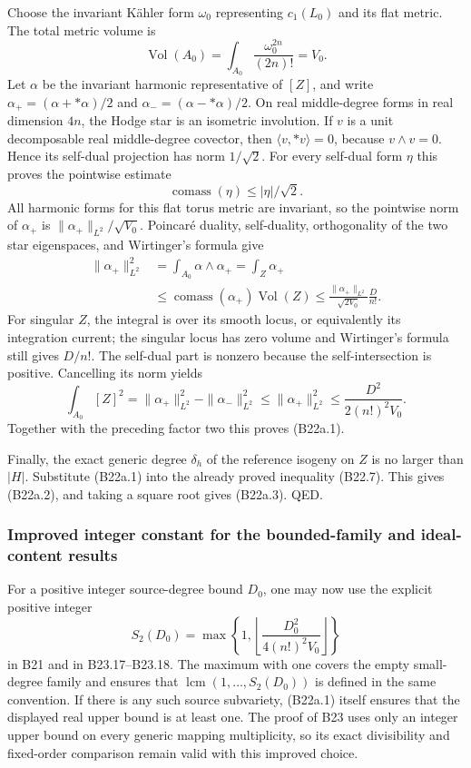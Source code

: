 \documentclass[11pt,a4paper]{article}
\theoremstyle{definition}
\begin{document}
Choose the invariant Kähler form \(\omega_0\) representing \(c_1(L_0)\) and its flat metric. The total metric volume is \[
 \operatorname{Vol}(A_0)=\int_{A_0}\frac{\omega_0^{2n}}{(2n)!}=V_0.
\] Let \(\alpha\) be the invariant harmonic representative of \([Z]\), and write \(\alpha_+=(\alpha+*\alpha)/2\) and \(\alpha_-=(\alpha-*\alpha)/2\). On real middle-degree forms in real dimension \(4n\), the Hodge star is an isometric involution. If \(v\) is a unit decomposable real middle-degree covector, then \(\langle v,*v\rangle=0\), because \(v\wedge v=0\). Hence its self-dual projection has norm \(1/\sqrt2\). For every self-dual form \(\eta\) this proves the pointwise estimate \[
 \operatorname{comass}(\eta)\le |\eta|/\sqrt2.
\] All harmonic forms for this flat torus metric are invariant, so the pointwise norm of \(\alpha_+\) is \(\|\alpha_+\|_{L^2}/\sqrt{V_0}\). Poincaré duality, self-duality, orthogonality of the two star eigenspaces, and Wirtinger's formula give \[
 \begin{aligned}
 \|\alpha_+\|_{L^2}^2
 &=\int_{A_0}\alpha\wedge\alpha_+
 =\int_Z\alpha_+\\
 &\le\operatorname{comass}(\alpha_+)\operatorname{Vol}(Z)
 \le\frac{\|\alpha_+\|_{L^2}}{\sqrt{2V_0}}\frac{D}{n!}.
 \end{aligned}
\tag{B22a.6}
\] For singular \(Z\), the integral is over its smooth locus, or equivalently its integration current; the singular locus has zero volume and Wirtinger's formula still gives \(D/n!\). The self-dual part is nonzero because the self-intersection is positive. Cancelling its norm yields \[
 \int_{A_0}[Z]^2
 =\|\alpha_+\|_{L^2}^2-\|\alpha_-\|_{L^2}^2
 \le\|\alpha_+\|_{L^2}^2
 \le\frac{D^2}{2(n!)^2V_0}.
\] Together with the preceding factor two this proves (B22a.1).

Finally, the exact generic degree \(\delta_h\) of the reference isogeny on \(Z\) is no larger than \(|H|\). Substitute (B22a.1) into the already proved inequality (B22.7). This gives (B22a.2), and taking a square root gives (B22a.3). QED.

\subsubsection{Improved integer constant for the bounded-family and ideal-content results}\label{improved-integer-constant-for-the-bounded-family-and-ideal-content-results}

For a positive integer source-degree bound \(D_0\), one may now use the explicit positive integer \[
 S_2(D_0)=\max\left\{1,
 \left\lfloor\frac{D_0^2}{4(n!)^2V_0}\right\rfloor\right\}
\tag{B22a.7}
\] in B21 and in B23.17--B23.18. The maximum with one covers the empty small-degree family and ensures that \(\operatorname{lcm}(1,\ldots,S_2(D_0))\) is defined in the same convention. If there is any such source subvariety, (B22a.1) itself ensures that the displayed real upper bound is at least one. The proof of B23 uses only an integer upper bound on every generic mapping multiplicity, so its exact divisibility and fixed-order comparison remain valid with this improved choice.
\end{document}
